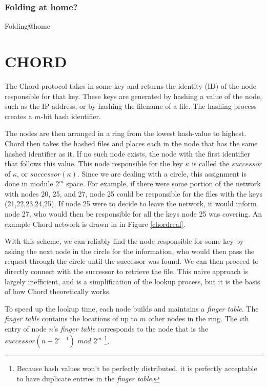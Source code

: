 \documentclass[conference, compsocconf, letterpaper]{IEEEtran}
\begin{document}
\subsubsection{Folding at home?}
Folding@home \cite{folding}

\section{CHORD}
The Chord protocol \cite{Chord} takes in some key and returns the identity (ID) of the node responsible for that key.  These keys are generated by hashing a value of the node, such as the IP address, or by hashing  the filename of a file.  The hashing process creates a $m$-bit hash identifier.

The nodes are then arranged in a ring from the lowest hash-value to highest.  Chord then takes the hashed files and places each in the node that has the same hashed identifier as it.  If no such node exists, the node with the first identifier that follows this value.  This node responsible for the key $\kappa$ is called the $successor$ of $\kappa$, or $successor(\kappa)$.  Since we are dealing with a circle, this assignment is done in module $2^m$ space.  For example, if there were some portion of the network with nodes 20, 25, and 27, node 25 could be responsible for the files with the keys (21,22,23,24,25). If node 25 were to decide to leave the network, it would inform node 27, who would then be responsible for all the keys node 25 was covering. An example Chord network is drawn in in Figure \ref{chordreal}.

With this scheme, we can reliably find the node responsible for some key by asking the next node in the circle for the information, who would then pass the request through the circle until the successor was found.  We can then proceed to directly connect with the successor to retrieve the file.  This naive approach is largely inefficient, and is a simplification of the lookup process, but it is the basis of how Chord theoretically works.

To speed up the lookup time, each node builds and maintains a \emph{finger table}.  The \emph{finger table} contains the locations of up to $m$ other nodes in the ring.  The $i$th entry of node $n$'s \emph{finger table} corresponds to the node that is the $successor(n+2^{i-1})$ $mod$ $2^m$ \footnote{Because hash values won't be perfectly distributed, it is perfectly acceptable to have duplicate entries in the \emph{finger table}.}. 
\end{document}
